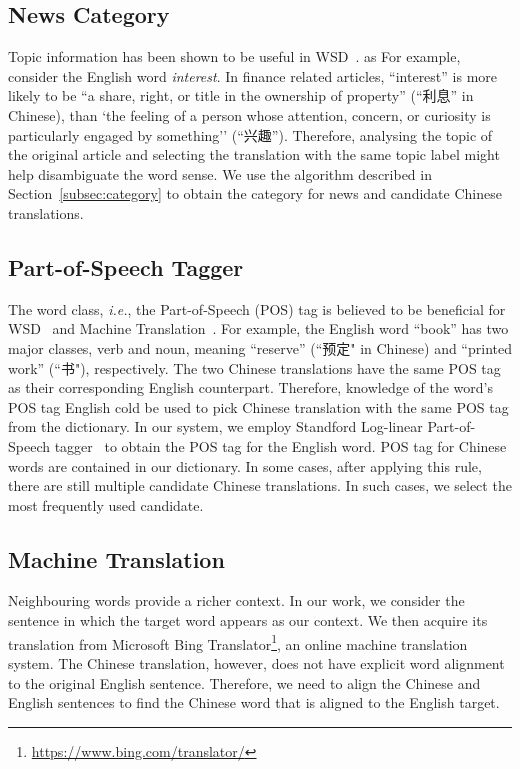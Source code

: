 \begin{CJK}{UTF8}{gbsn}
\subsection{News Category}
Topic information has been shown to be useful in WSD~\cite{Boyd-Graber2007}. as For example, consider the English word \textit{interest}. In finance related articles, ``interest'' is more likely to be ``a share, right, or title in the ownership of property'' (``利息'' in Chinese), than `the feeling of a person whose attention, concern, or curiosity is particularly engaged by something'' (``兴趣'').  Therefore, analysing the topic of the original article and selecting the translation with the same topic label might help disambiguate the word sense. We use the algorithm described in Section~\ref{subsec:category} to obtain the category for news and candidate Chinese translations. 

\subsection{Part-of-Speech Tagger}
The word class, {\it i.e.}, the Part-of-Speech (POS) tag is believed to be beneficial for WSD~\cite{Wilks1998} and Machine Translation~\cite{Toutanova2002,Ueffing2003}.
For example, the English word ``book'' has two major classes, verb and noun, meaning ``reserve'' (``预定" in Chinese) and ``printed work'' (``书"), respectively. The two Chinese translations have the same POS tag as their corresponding English counterpart.
Therefore, knowledge of the word's POS tag English cold be used to pick Chinese translation with the same POS tag from the dictionary.
In our system, we employ Standford Log-linear Part-of-Speech tagger~\cite{Toutanova2003} to obtain the POS tag for the English word. POS tag for Chinese words are contained in our dictionary.
In some cases, after applying this rule, there are still multiple candidate Chinese translations. In such cases, we select the most frequently used candidate.

\subsection{Machine Translation}
Neighbouring words provide a richer context. In our work, we consider the sentence in which the target word appears as our context. We then acquire its  translation from Microsoft Bing Translator\footnote{\url{https://www.bing.com/translator/}}, an online machine translation system. The Chinese translation, however, does not have explicit word alignment to the original English sentence. Therefore, we need to align the Chinese and English sentences to find the Chinese word that is aligned to the English target.


\end{CJK}
